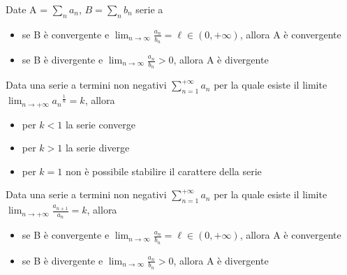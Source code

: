 \documentclass[letterpaper,10pt,italian]{jupyterBook}
\begin{document}
\sphinxAtStartPar
{} Date A = \(\sum_n a_n\), \(B =\sum_n b_n\) serie a 
\begin{itemize}
\item {} 
\sphinxAtStartPar
se B è convergente e \(\lim_{n \rightarrow \infty} \frac{a_n}{b_n} = \ell \in (0, +\infty)\), allora A è convergente

\item {} 
\sphinxAtStartPar
se B è  divergente e \(\lim_{n \rightarrow \infty} \frac{a_n}{b_n} > 0\), allora A è  divergente

\end{itemize}

\sphinxAtStartPar
{}

\sphinxAtStartPar
{} Data una serie a termini non negativi \(\sum_{n=1}^{+\infty} a_n\) per la quale esiste il limite \(\lim_{n \rightarrow +\infty} {a_n}^{\frac{1}{n}} = k\), allora
\begin{itemize}
\item {} 
\sphinxAtStartPar
per \(k < 1\) la serie converge

\item {} 
\sphinxAtStartPar
per \(k > 1\) la serie diverge

\item {} 
\sphinxAtStartPar
per \(k = 1\) non è possibile stabilire il carattere della serie

\end{itemize}

\sphinxAtStartPar
{} Data una serie a termini non negativi \(\sum_{n=1}^{+\infty} a_n\) per la quale esiste il limite \(\lim_{n \rightarrow +\infty} \frac{a_{n+1}}{a_n} = k\), allora
\begin{itemize}
\item {} 
\sphinxAtStartPar
se B è convergente e \(\lim_{n \rightarrow \infty} \frac{a_n}{b_n} = \ell \in (0, +\infty)\), allora A è convergente

\item {} 
\sphinxAtStartPar
se B è  divergente e \(\lim_{n \rightarrow \infty} \frac{a_n}{b_n} > 0\), allora A è  divergente

\end{itemize}

\sphinxAtStartPar
{}
\end{document}
